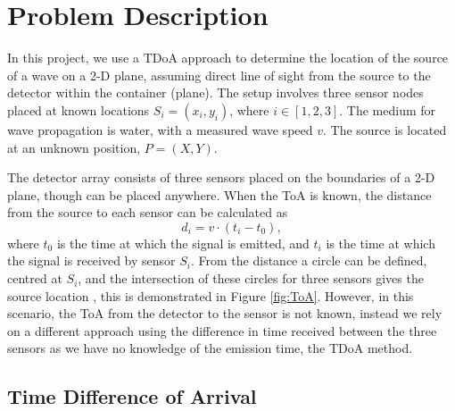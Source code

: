 \section{Problem Description}

In this project, we use a \ac{TDoA} approach to determine the location of the source of a wave on a 2-D plane, assuming direct line of sight from the source to the detector within the container (plane). The setup involves three sensor nodes placed at known locations \( S_i = (x_i, y_i) \), where \( i \in [1, 2, 3] \). The medium for wave propagation is water, with a measured wave speed \( v \). The source is located at an unknown position, \( P = (X, Y) \).

The detector array consists of three sensors placed on the boundaries of a 2-D plane, though can be placed anywhere. When the ToA is known, the distance from the source to each sensor can be calculated as
\begin{equation}
     d_{i} = v \cdot (t_i - t_0),
    \label{eqn:di}
\end{equation}
where \( t_0 \) is the time at which the signal is emitted, and \( t_i \) is the time at which the signal is received by sensor \( S_i \). From the distance a circle can be defined, centred at \( S_i \), and the intersection of these circles for three sensors gives the source location \cite{TDOA}, this is demonstrated in Figure \ref{fig:ToA}. However, in this scenario, the ToA from the detector to the sensor is not known, instead we rely on a different approach using the difference in time received between the three sensors as we have no knowledge of the emission time, the TDoA method.



\subsection{Time Difference of Arrival}

